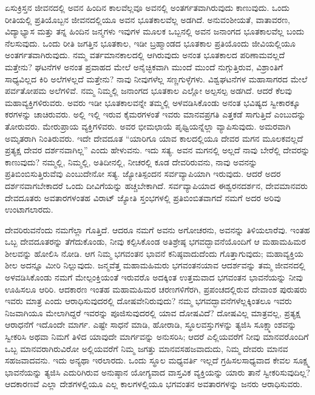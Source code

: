 ಏಸುಕ್ರಿಸ್ತನ ಜೀವನದಲ್ಲಿ ಅವನ ಹಿಂದಿನ ಕಾಲವೆಲ್ಲವೂ ಅವನಲ್ಲಿ ಅಂತರ್ಗತವಾಗಿರುವುದು ಕಾಣುವುದು. ಒಂದು ರೀತಿಯಲ್ಲಿ ಪ್ರತಿಯೊಬ್ಬನ ಜೀವನದಲ್ಲಿಯೂ ಅವನ ಭೂತಕಾಲವೆಲ್ಲ ಅಡಗಿದೆ. ಅನುವಂಶೀಯತೆ, ವಾತಾವರಣ, ವಿದ್ಯಾಭ್ಯಾಸ ಮತ್ತು ತನ್ನ ಹಿಂದಿನ ಜನ್ಮಗಳು ಇವುಗಳ ಮೂಲಕ ಒಬ್ಬನಲ್ಲಿ ಅವನ ಜನಾಂಗದ ಭೂತಕಾಲವೆಲ್ಲ ಬಂದು ನೆಲಸುವುದು. ಒಂದು ರೀತಿ ಜಗತ್ತಿನ ಭೂತಕಾಲ, ಇಡೀ ಬ್ರಹ್ಮಾಂಡದ ಭೂತಕಾಲ ಪ್ರತಿಯೊಂದು ಜೀವಿಯಲ್ಲಿಯೂ ಅಂತರ್ಗತವಾಗಿರುವುದು. ನಮ್ಮ ವರ್ತಮಾನಕಾಲದಲ್ಲಿ ಆಗಿರುವುದು ಅನಂತ ಭೂತಕಾಲದ ಪರಿಣಾಮವಲ್ಲದೆ ಮತ್ತೇನು? ಘಟನೆಗಳ ಅನಂತ ಪ್ರವಾಹದ ಮೇಲೆ ಅನೈಚ್ಛಿಕವಾಗಿ ಮುಂದೆ ಮುಂದೆ ನುಗ್ಗುತ್ತಿರುವ, ವಿಶ್ರಾಂತಿಗೆ ಸಾಧ್ಯವಿಲ್ಲದ ಕಿರಿ ಅಲೆಗಳಲ್ಲದೆ ಮತ್ತೇನು? ನಾವು ನೀವುಗಳೆಲ್ಲ ಸಣ್ಣಗುಳ್ಳೆಗಳು. ವಿಶ್ವಘಟನೆಗಳ ಮಹಾಸಾಗರದ ಮೇಲೆ ಪರ್ವತೋಪಮ ಅಲೆಗಳಿವೆ. ನಮ್ಮ ನಿಮ್ಮಲ್ಲಿ ಜನಾಂಗದ ಭೂತಕಾಲ ಎಲ್ಲೋ ಅಲ್ಪಸಲ್ಪ ಅಡಗಿದೆ. ಆದರೆ ಕೆಲವು ಮಹಾವ್ಯಕ್ತಿಗಳಿರುವರು. ಅವರು ಇಡೀ ಭೂತಕಾಲವನ್ನೇ ತಮ್ಮಲ್ಲಿ ಅಳವಡಿಸಿಕೊಂಡು ಅನಂತ ಭವಿಷ್ಯದ ಸ್ವೀಕಾರಕ್ಕೂ ಕರಗಳನ್ನು ಚಾಚಿರುವರು. ಅಲ್ಲಿ ಇಲ್ಲಿ ಇರುವ ಕೈಮರಗಳಂತೆ ಇವರು ಮಾನವಪ್ರಗತಿ ಎತ್ತಕಡೆ ಸಾಗುತ್ತಿದೆ ಎಂಬುದನ್ನು ತೋರುವರು. ಮೇರುಪ್ರಾಯ ವ್ಯಕ್ತಿಗಳಿವರು. ಅವರ ಭೀಮಛಾಯೆ ಪೃಥ್ವಿಯನ್ನೆಲ್ಲಾ ವ್ಯಾಪಿಸುವುದು. ಅಮರವಾಗಿ ಅಮೃತರಾಗಿ ನಿಂತಿರುವರು. ಇದೇ ದೇವದೂತ “ಯಾರಿಗೂ ಯಾವ ಕಾಲದಲ್ಲಿಯೂ ದೇವರ ಮಗನ ಮೂಲಕವಲ್ಲದೆ ಪ್ರತ್ಯಕ್ಷ ದೇವರ ದರ್ಶನವಾಗಿಲ್ಲ” ಎಂದು ಹೇಳುವನು. ಇದು ಸತ್ಯ. ಅವನ ಮಗನಲ್ಲಿ ಅಲ್ಲದೆ ನಾವು ಬೇರೆಲ್ಲಿ ದೇವರನ್ನು ಕಾಣುವುದು? ನಮ್ಮಲ್ಲಿ, ನಿಮ್ಮಲ್ಲಿ, ಅತಿದೀನಲ್ಲಿ, ನೀಚರಲ್ಲಿ ಕೂಡ ದೇವರಿರುವನು, ನಾವು ಅವನನ್ನು ಪ್ರತಿಬಿಂಬಿಸುತ್ತಿರುವೆವು ಎಂಬುದೇನೋ ಸತ್ಯ. ಜ್ಯೋತಿಸ್ಪಂದನ ಸರ್ವವ್ಯಾಪಿಯಾಗಿ ಇರುವುದು. ಆದರೆ ಅದರ ದರ್ಶನವಾಗಬೇಕಾದರೆ ಒಂದು ದೀವಿಗೆಯನ್ನು ಹಚ್ಚಬೇಕಾಗಿದೆ. ಸರ್ವವ್ಯಾಪಿಯಾದ ಈಶ್ವರನದರ್ಶನ, ದೇವಮಾನವರು ದೇವದೂತರು ಅವತಾರಗಳಂತಹ ವಿರಾಟ್​ ಜ್ಯೋತಿ ಸ್ತಂಭಗಳಲ್ಲಿ ಪ್ರತಿಬಿಂಬಿತವಾಗದೆ ನಮಗೆ ಅದರ ಅರಿವು ಉಂಟಾಗಲಾರದು.

ದೇವರಿರುವನೆಂದು ನಮಗೆಲ್ಲಾ ಗೊತ್ತಿದೆ. ಆದರೂ ನಮಗೆ ಅವನು ಅಗೋಚರನು, ಅವ\-ನನ್ನು ತಿಳಿಯಲಾರೆವು. ಇಂತಹ ಒಬ್ಬ ದೇವದೂತರನ್ನು ತೆಗೆದುಕೊಂಡು, ನೀವು ಕಲ್ಪಿಸಿ\break ಕೊಂಡ ಅತಿಶ್ರೇಷ್ಠ ಭಗವದ್ಭಾವನೆಯೊಂದಿಗೆ ಆ ಮಹಾಮಹಿಮರ ಶೀಲವನ್ನು ಹೋಲಿಸಿ ನೋಡಿ. ಆಗ ನಿಮ್ಮ ಭಗವಂತನ ಭಾವನೆ ಕನಿಷ್ಠವಾದುದೆಂದು ಗೊತ್ತಾಗುವುದು; ಮಹಾ\break ವ್ಯಕ್ತಿಯ ಶೀಲ ಅದನ್ನೂ ಮೀರಿ ನಿಲ್ಲುವುದು. ಜನ್ಮವೆತ್ತ ಮಹಾಮಹಿಮರು ಭಗವಂತನ\break ಯಾವ ಆದರ್ಶವನ್ನು ತಮ್ಮ ಜೀವನದಲ್ಲಿ ಅಳವಡಿಸಿಕೊಂಡು ನಮಗೆ ಮೇಲ್ಪಂಕ್ತಿಯಂತೆ ಇರುವರೊ ಅದಕ್ಕಿಂತ ಉತ್ತಮವಾದ ಭಗವಂತನ ಭಾವನೆಯನ್ನು ನೀವು ಊಹಿಸಲೂ ಆರಿರಿ. ಆದಕಾರಣ ಇಂತಹ ಮಹಾಮಹಿಮರ ಚರಣಗಳಿಗೆರಗಿ, ಪ್ರಪಂಚದಲ್ಲಿರುವ ದೇವಾಂಶ ಪುರುಷರು ಇವರು ಮಾತ್ರ ಎಂದು ಆರಾಧಿಸುವುದರಲ್ಲಿ ದೋಷವೇನಿರುವುದು?\- ನಮ್ಮ ಭಗವದ್ಭಾವನೆಗಳೆಲ್ಲಕ್ಕಿಂತಲೂ ಇವರು ನಿಜವಾಗಿಯೂ ಮೇಲಾಗಿದ್ದರೆ ಇವರನ್ನು ಪೂಜಿಸುವುದರಲ್ಲಿ ಯಾವ ದೋಷವಿದೆ? ದೋಷವಿಲ್ಲ ಮಾತ್ರವಲ್ಲ, ಪ್ರತ್ಯಕ್ಷ ಆರಾಧನೆಗೆ ಇದೊಂದೇ ಮಾರ್ಗ. ಎಷ್ಟೇ ಸಾಧನೆ ಮಾಡಿ, ಹೋರಾಡಿ, ಸ್ಥೂಲವಸ್ತುಗಳನ್ನು ತ್ಯಜಿಸಿ ಸೂಕ್ಷ್ಮಾಂಶವನ್ನು ಸ್ವೀಕರಿಸಿ ಅಥವಾ ನಿಮಗೆ ತಿಳಿದ ಯಾವುದೇ ಮಾರ್ಗವನ್ನು ಅನುಸರಿಸಿ; ಆದರೆ ಎಲ್ಲಿಯವರೆಗೆ ನೀವು ಮಾನವರೊಂದಿಗೆ ಒಬ್ಬ ಮಾನವರಾಗಿರುವಿರೋ ಅಲ್ಲಿಯ\-ವರೆಗೆ ನಿಮ್ಮ ಜಗತ್ತು ಮಾನವಸಹಜವಾದುದು, ನಿಮ್ಮ ದೇವರು ಮಾನವ ಸಹಜವಾದವನು. ಇದು ಅನ್ಯಥಾ ಇರಲಾರದು. ಒಂದು ಸ್ಥೂಲ ಮಧ್ಯವರ್ತಿ ಇಲ್ಲದೆ ಗ್ರಹಿಸಲಸಾಧ್ಯವಾದ ಕೇವಲ ಸೂಕ್ಷ್ಮ ಭಾವನೆಯನ್ನು ತ್ಯಜಿಸಿ ಎದುರಿಗಿರುವ ಅನುಷ್ಠಾನ ಯೋಗ್ಯವಾದ ವಾಸ್ತವಿಕ ವ್ಯಕ್ತಿಯನ್ನು ಯಾರು ತಾನೆ ಸ್ವೀಕರಿಸುವುದಿಲ್ಲ? ಆದಕಾರಣವೆ ಎಲ್ಲಾ ದೇಶಗಳಲ್ಲಿಯೂ ಎಲ್ಲ ಕಾಲಗಳಲ್ಲಿಯೂ ಭಗವಂತನ ಅವತಾರಗಳನ್ನು ಜನರು ಆರಾಧಿಸುವರು.

